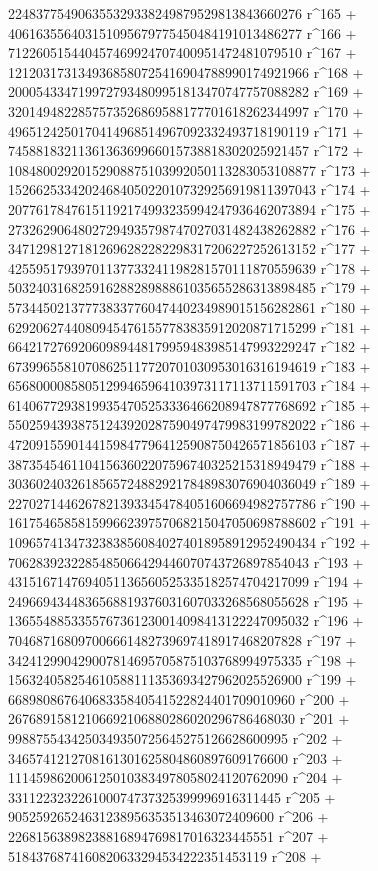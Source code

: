        224837754906355329338249879529813843660276 r^165 + 
       406163556403151095679775450484191013486277 r^166 + 
       712260515440457469924707400951472481079510 r^167 + 
       1212031731349368580725416904788990174921966 r^168 + 
       2000543347199727934809951813470747757088282 r^169 + 
       3201494822857573526869588177701618262344997 r^170 + 
       4965124250170414968514967092332493718190119 r^171 + 
       7458818321136136369966015738818302025921457 r^172 + 
       10848002920152908875103992050113283053108877 r^173 + 
       15266253342024684050220107329256919811397043 r^174 + 
       20776178476151192174993235994247936462073894 r^175 + 
       27326290648027294935798747027031482438262882 r^176 + 
       34712981271812696282282298317206227252613152 r^177 + 
       42559517939701137733241198281570111870559639 r^178 + 
       50324031682591628828988861035655286313898485 r^179 + 
       57344502137773833776047440234989015156282861 r^180 + 
       62920627440809454761557783835912020871715299 r^181 + 
       66421727692060989448179959483985147993229247 r^182 + 
       67399655810708625117720701030953016316194619 r^183 + 
       65680000858051299465964103973117113711591703 r^184 + 
       61406772938199354705253336466208947877768692 r^185 + 
       55025943938751243920287590497479983199782022 r^186 + 
       47209155901441598477964125908750426571856103 r^187 + 
       38735454611041563602207596740325215318949479 r^188 + 
       30360240326185657248829217848983076904036049 r^189 + 
       22702714462678213933454784051606694982757786 r^190 + 
       16175465858159966239757068215047050698788602 r^191 + 
       10965741347323838560840274018958912952490434 r^192 + 
       7062839232285485066429446070743726897854043 r^193 + 
       4315167147694051136560525335182574704217099 r^194 + 
       2496694344836568819376031607033268568055628 r^195 + 
       1365548853355767361230014098413122247095032 r^196 + 
       704687168097006661482739697418917468207828 r^197 + 
       342412990429007814695705875103768994975335 r^198 + 
       156324058254610588111353693427962025526900 r^199 + 
       66898086764068335840541522824401709010960 r^200 + 
       26768915812106692106880286020296786468030 r^201 + 
       9988755434250349350725645275126628600995 r^202 + 
       3465741212708161301625804860897609176600 r^203 + 
       1114598620061250103834978058024120762090 r^204 + 
       331122323226100074737325399996916311445 r^205 + 
       90525926524631238956353513463072409600 r^206 + 
       22681563898238816894769817016323445551 r^207 + 
       5184376874160820633294534222351453119 r^208 + 
